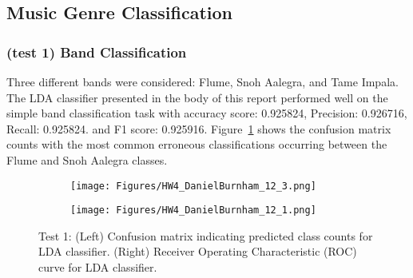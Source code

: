 \documentclass{article}
\begin{document}

\subsection{Music Genre Classification}
\subsubsection{(test 1) Band Classification} 
Three different bands were considered: Flume, Snoh Aalegra, and Tame Impala. The LDA classifier presented in the body of this report performed well on the simple band classification task with accuracy score: 0.925824, Precision: 0.926716, Recall: 0.925824. and F1 score: 0.925916. Figure~\ref{fig:LDAtest1} shows the confusion matrix counts with the most common erroneous classifications occurring between the Flume and Snoh Aalegra classes.
\begin{figure}
\centering
   \begin{subfigure}{0.49\linewidth} \centering
     \texttt{[image: Figures/HW4\_DanielBurnham\_12\_3.png]}
   \end{subfigure}
   \begin{subfigure}{0.49\linewidth} \centering
     \texttt{[image: Figures/HW4\_DanielBurnham\_12\_1.png]}
   \end{subfigure}
\caption{Test 1: (Left) Confusion matrix indicating predicted class counts for LDA classifier. (Right) Receiver Operating Characteristic (ROC) curve for LDA classifier.} \label{fig:LDAtest1}
\end{figure}
\end{document}
